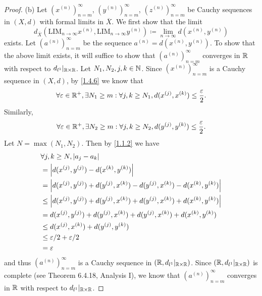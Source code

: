 \begin{proof}{(b)}
  Let \((x^{(n)})_{n = m}^\infty\), \((y^{(n)})_{n = m}^\infty\), \((z^{(n)})_{n = m}^\infty\) be Cauchy sequences in \((X, d)\) with formal limits in \(\overline{X}\).
  We first show that the limit
  \[
    d_{\overline{X}}(\text{LIM}_{n \to \infty} x^{(n)}, \text{LIM}_{n \to \infty} y^{(n)}) \coloneqq \lim_{n \to \infty} d(x^{(n)}, y^{(n)})
  \]
  exists.
  Let \((a^{(n)})_{n = m}^\infty\) be the sequence \(a^{(n)} = d(x^{(n)}, y^{(n)})\).
  To show that the above limit exists, it will suffice to show that \((a^{(n)})_{n = m}^\infty\) converges in \(\mathbb{R}\) with respect to \(d_{l^1}|_{\mathbb{R} \times \mathbb{R}}\).
  Let \(N_1, N_2, j, k \in \mathbb{N}\).
  Since \((x^{(n)})_{n = m}^\infty\) is a Cauchy sequence in \((X, d)\), by \cref{1.4.6} we know that
  \[
    \forall \varepsilon \in \mathbb{R}^+, \exists N_1 \geq m : \forall j, k \geq N_1, d(x^{(j)}, x^{(k)}) \leq \dfrac{\varepsilon}{2}.
  \]
  Similarly,
  \[
    \forall \varepsilon \in \mathbb{R}^+, \exists N_2 \geq m : \forall j, k \geq N_2, d(y^{(j)}, y^{(k)}) \leq \dfrac{\varepsilon}{2}.
  \]
  Let \(N = \max(N_1, N_2)\).
  Then by \cref{1.1.2} we have
  \begin{align*}
     & \forall j, k \geq N, \left\lvert a_j - a_k\right\rvert                                                             \\
     & = \left\lvert d(x^{(j)}, y^{(j)}) - d(x^{(k)}, y^{(k)})\right\rvert                                                \\
     & = \left\lvert d(x^{(j)}, y^{(j)}) + d(y^{(j)}, x^{(k)}) - d(y^{(j)}, x^{(k)}) - d(x^{(k)}, y^{(k)})\right\rvert    \\
     & \leq \left\lvert d(x^{(j)}, y^{(j)}) + d(y^{(j)}, x^{(k)}) + d(y^{(j)}, x^{(k)}) + d(x^{(k)}, y^{(k)})\right\rvert \\
     & = d(x^{(j)}, y^{(j)}) + d(y^{(j)}, x^{(k)}) + d(y^{(j)}, x^{(k)}) + d(x^{(k)}, y^{(k)})          \\
     & \leq d(x^{(j)}, x^{(k)}) + d(y^{(j)}, y^{(k)})                                                   \\
     & \leq \varepsilon / 2 + \varepsilon / 2                                                           \\
     & = \varepsilon
  \end{align*}
  and thus \((a^{(n)})_{n = m}^\infty\) is a Cauchy sequence in \((\mathbb{R}, d_{l^1}|_{\mathbb{R} \times \mathbb{R}})\).
  Since \((\mathbb{R}, d_{l^1}|_{\mathbb{R} \times \mathbb{R}})\) is complete (see Theorem 6.4.18, Analysis I), we know that \((a^{(n)})_{n = m}^\infty\) converges in \(\mathbb{R}\) with respect to \(d_{l^1}|_{\mathbb{R} \times \mathbb{R}}\).


\end{proof}
